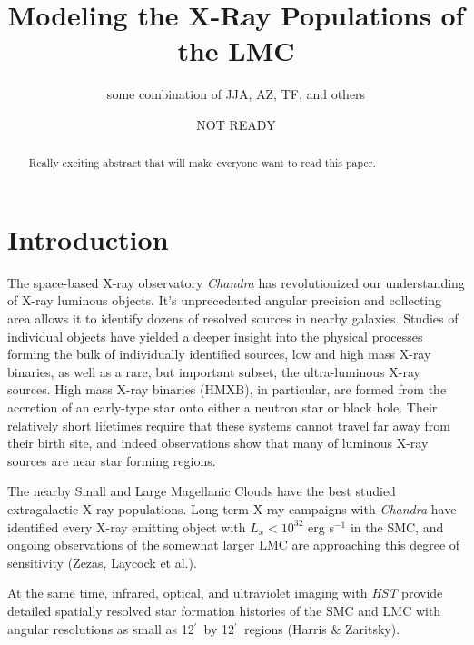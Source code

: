 \documentclass[12pt, preprint]{aastex}
\newcommand{\amin}{\ifmmode {^{\prime}\ }\else$^{\prime}$\fi}
\begin{document}
\title{Modeling the X-Ray Populations of the LMC}
\author{some combination of JJA, AZ, TF, and others}
\date{NOT READY}

\begin{abstract}
Really exciting abstract that will make everyone want to read this paper.
\end{abstract}

\section{Introduction}

The space-based X-ray observatory {\it Chandra} has revolutionized our understanding of X-ray luminous objects. It's unprecedented angular precision and collecting area allows it to identify dozens of resolved sources in nearby galaxies. Studies of individual objects have yielded a deeper insight into the physical processes forming the bulk of individually identified sources, low and high mass X-ray binaries, as well as a rare, but important subset, the ultra-luminous X-ray sources. High mass X-ray binaries (HMXB), in particular, are formed from the accretion of an early-type star onto either a neutron star or black hole. Their relatively short lifetimes require that these systems cannot travel far away from their birth site, and indeed observations show that many of luminous X-ray sources are near star forming regions. 

The nearby Small and Large Magellanic Clouds have the best studied extragalactic X-ray populations. Long term X-ray campaigns with {\it Chandra} have identified every X-ray emitting object with $L_x < 10^{32}$ erg s$^{-1}$ in the SMC, and ongoing observations of the somewhat larger LMC are approaching this degree of sensitivity (Zezas, Laycock et al.). 

At the same time, infrared, optical, and ultraviolet imaging with {\it HST} provide detailed spatially resolved star formation histories of the SMC and LMC with angular resolutions as small as 12\amin\ by 12\amin\ regions (Harris \& Zaritsky). 
\end{document}
